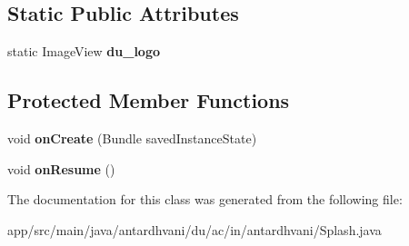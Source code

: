 \subsection*{Static Public Attributes}
\begin{DoxyCompactItemize}
\item 
\hypertarget{classantardhvani_1_1du_1_1ac_1_1in_1_1antardhvani_1_1_splash_a9166047db0a7509731109eb35c8759e9}{}static Image\+View {\bfseries du\+\_\+logo}\label{classantardhvani_1_1du_1_1ac_1_1in_1_1antardhvani_1_1_splash_a9166047db0a7509731109eb35c8759e9}

\end{DoxyCompactItemize}
\subsection*{Protected Member Functions}
\begin{DoxyCompactItemize}
\item 
\hypertarget{classantardhvani_1_1du_1_1ac_1_1in_1_1antardhvani_1_1_splash_a255c93175bb557246f24e0a9f4efe284}{}void {\bfseries on\+Create} (Bundle saved\+Instance\+State)\label{classantardhvani_1_1du_1_1ac_1_1in_1_1antardhvani_1_1_splash_a255c93175bb557246f24e0a9f4efe284}

\item 
\hypertarget{classantardhvani_1_1du_1_1ac_1_1in_1_1antardhvani_1_1_splash_a47d1ed61261cbb4ebdc71d67d0d5c100}{}void {\bfseries on\+Resume} ()\label{classantardhvani_1_1du_1_1ac_1_1in_1_1antardhvani_1_1_splash_a47d1ed61261cbb4ebdc71d67d0d5c100}

\end{DoxyCompactItemize}


The documentation for this class was generated from the following file\+:\begin{DoxyCompactItemize}
\item 
app/src/main/java/antardhvani/du/ac/in/antardhvani/Splash.\+java\end{DoxyCompactItemize}
